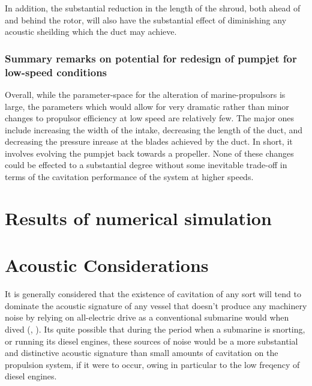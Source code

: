 \documentclass{article}\usepackage[]{graphicx}\usepackage[]{color}
\begin{document}
In addition, the substantial reduction in the length of the shroud, both ahead of and behind the rotor, will also have the substantial effect of diminishing any acoustic sheilding which the duct may achieve.

\subsubsection{Summary remarks on potential for redesign of pumpjet for low-speed conditions}
Overall, while the parameter-space for the alteration of marine-propulsors is large, the parameters which would allow for very dramatic rather than minor changes to propulsor efficiency at low speed are relatively few.  The major ones include increasing the width of the intake, decreasing the length of the duct, and decreasing the pressure inrease at the blades achieved by the duct.  In short, it involves evolving the pumpjet back towards a propeller.  None of these changes could be effected to a substantial degree without some inevitable trade-off in terms of the cavitation performance of the system at higher speeds.

\section{Results of numerical simulation}

\section{Acoustic Considerations}
It is generally considered that the existence of cavitation of any sort will tend to dominate the acoustic signature of any vessel that doesn't produce any machinery noise by relying on all-electric drive as a conventional submarine would when dived (\cite{giles2010}, \cite{harvie1965construction}).  Its quite possible that during the period when a submarine is snorting, or running its diesel engines, these sources of noise would be a more substantial and distinctive acoustic signature than small amounts of cavitation on the propulsion system, if it were to occur, owing in particular to the low freqency of diesel engines.
\end{document}
